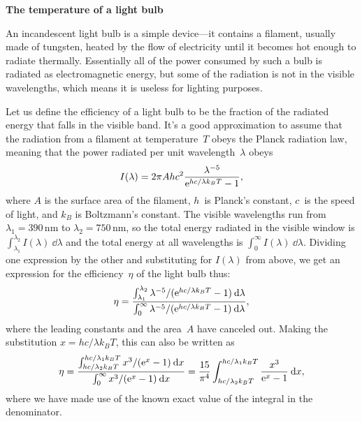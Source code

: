 \documentclass[12pt]{article}
\begin{document}
\begin{exercises}

\exercise \textbf{The temperature of a light bulb}

\exskip An incandescent light bulb is a simple device---it contains a
filament, usually made of tungsten, heated by the flow of electricity until
it becomes hot enough to radiate thermally.  Essentially all of the power
consumed by such a bulb is radiated as electromagnetic energy, but some of
the radiation is not in the visible wavelengths, which means it is useless
for lighting purposes.

Let us define the efficiency of a light bulb to be the fraction of the
radiated energy that falls in the visible band.  It's a good approximation
to assume that the radiation from a filament at temperature~$T$ obeys the
Planck radiation law, meaning that the power radiated per unit
wavelength~$\lambda$ obeys
\begin{displaymath}
  I(\lambda) = 2\pi A hc^2 {\lambda^{-5}\over\mathrm{e}^{hc/\lambda k_BT}-1},
\end{displaymath}
where $A$ is the surface area of the filament, $h$~is Planck's constant,
$c$~is the speed of light, and $k_B$ is Boltzmann's constant.  The visible
wavelengths run from $\lambda_1=390\,$nm to $\lambda_2=750\,$nm, so the
total energy radiated in the visible window is
$\int_{\lambda_1}^{\lambda_2} I(\lambda)\>\dd\lambda$ and the total energy
at all wavelengths is $\int_0^\infty I(\lambda)\>\dd\lambda$.  Dividing one
expression by the other and substituting for $I(\lambda)$ from above, we
get an expression for the efficiency~$\eta$ of the light bulb thus:
\begin{displaymath}
\eta = {\int_{\lambda_1}^{\lambda_2} \lambda^{-5}/(\mathrm{e}^{hc/\lambda
        k_BT}-1) \>\mathrm{d}\lambda\over
        \int_0^\infty \lambda^{-5}/(\mathrm{e}^{hc/\lambda k_BT}-1) \>\mathrm{d}\lambda},
\end{displaymath}
where the leading constants and the area~$A$ have canceled out.  Making
the substitution $x=hc/\lambda k_BT$, this can also be written as
\begin{displaymath}
\eta = {\int_{hc/\lambda_2 k_BT}^{hc/\lambda_1 k_BT} x^3/(\mathrm{e}^x-1) \>\mathrm{d} x
        \over \int_0^\infty x^3/(\mathrm{e}^x-1) \>\mathrm{d} x}
     = {15\over\pi^4}
       \int_{hc/\lambda_2 k_BT}^{hc/\lambda_1 k_BT}
       {x^3\over\mathrm{e}^x-1} \>\mathrm{d} x,
\end{displaymath}
where we have made use of the known exact value of the integral in the
denominator.


\end{exercises}
\end{document}
